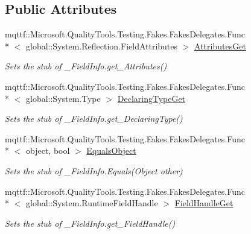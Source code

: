 \subsection*{Public Attributes}
\begin{DoxyCompactItemize}
\item 
mqttf\-::\-Microsoft.\-Quality\-Tools.\-Testing.\-Fakes.\-Fakes\-Delegates.\-Func\\*
$<$ global\-::\-System.\-Reflection.\-Field\-Attributes $>$ \hyperlink{class_system_1_1_runtime_1_1_interop_services_1_1_fakes_1_1_stub___field_info_ae2a5b069a50f4d64b073986ec85530de}{Attributes\-Get}
\begin{DoxyCompactList}\small\item\em Sets the stub of \-\_\-\-Field\-Info.\-get\-\_\-\-Attributes()\end{DoxyCompactList}\item 
mqttf\-::\-Microsoft.\-Quality\-Tools.\-Testing.\-Fakes.\-Fakes\-Delegates.\-Func\\*
$<$ global\-::\-System.\-Type $>$ \hyperlink{class_system_1_1_runtime_1_1_interop_services_1_1_fakes_1_1_stub___field_info_a3118dbaf08eb06b3e59f0ccaca50a81c}{Declaring\-Type\-Get}
\begin{DoxyCompactList}\small\item\em Sets the stub of \-\_\-\-Field\-Info.\-get\-\_\-\-Declaring\-Type()\end{DoxyCompactList}\item 
mqttf\-::\-Microsoft.\-Quality\-Tools.\-Testing.\-Fakes.\-Fakes\-Delegates.\-Func\\*
$<$ object, bool $>$ \hyperlink{class_system_1_1_runtime_1_1_interop_services_1_1_fakes_1_1_stub___field_info_af1f5051ec3d26937da1b6565ac16c1a7}{Equals\-Object}
\begin{DoxyCompactList}\small\item\em Sets the stub of \-\_\-\-Field\-Info.\-Equals(\-Object other)\end{DoxyCompactList}\item 
mqttf\-::\-Microsoft.\-Quality\-Tools.\-Testing.\-Fakes.\-Fakes\-Delegates.\-Func\\*
$<$ global\-::\-System.\-Runtime\-Field\-Handle $>$ \hyperlink{class_system_1_1_runtime_1_1_interop_services_1_1_fakes_1_1_stub___field_info_ad553ccb9decad4de5e39c1775a08645c}{Field\-Handle\-Get}
\begin{DoxyCompactList}\small\item\em Sets the stub of \-\_\-\-Field\-Info.\-get\-\_\-\-Field\-Handle()\end{DoxyCompactList}\item 

\end{DoxyCompactItemize}

